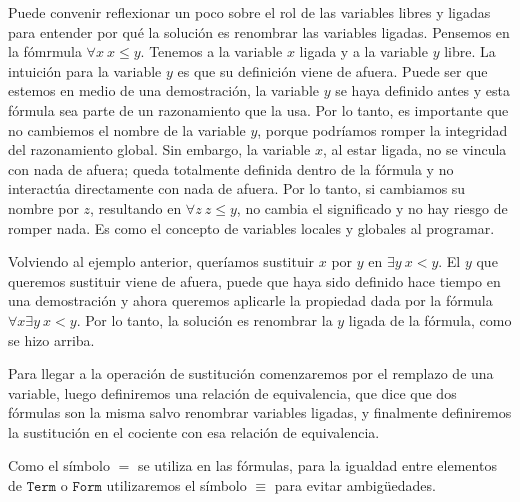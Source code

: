 \documentclass[a4paper, 12pt]{report}
\theoremstyle{definition}
\begin{document}
Puede convenir reflexionar un poco sobre el rol de las variables libres y ligadas para entender por qué la solución es renombrar las variables ligadas. Pensemos en la fómrmula $\forall x~ x\leq y$. Tenemos a la variable $x$ ligada y a la variable $y$ libre. La intuición para la variable $y$ es que su definición viene de afuera. Puede ser que estemos en medio de una demostración, la variable $y$ se haya definido antes y esta fórmula sea parte de un razonamiento que la usa. Por lo tanto, es importante que no cambiemos el nombre de la variable $y$, porque podríamos romper la integridad del razonamiento global. Sin embargo, la variable $x$, al estar ligada, no se vincula con nada de afuera; queda totalmente definida dentro de la fórmula y no interactúa directamente con nada de afuera. Por lo tanto, si cambiamos su nombre por $z$, resultando en $\forall z~ z\leq y$, no cambia el significado y no hay riesgo de romper nada. Es como el concepto de variables locales y globales al programar.

Volviendo al ejemplo anterior, queríamos sustituir $x$ por $y$ en $\exists y~ x<y$. El $y$ que queremos sustituir viene de afuera, puede que haya sido definido hace tiempo en una demostración y ahora queremos aplicarle la propiedad dada por la fórmula $\forall x\exists y~ x<y$. Por lo tanto, la solución es renombrar la $y$ ligada de la fórmula, como se hizo arriba.

Para llegar a la operación de sustitución comenzaremos por el remplazo de una variable, luego definiremos una relación de equivalencia, que dice que dos fórmulas son la misma salvo renombrar variables ligadas, y finalmente definiremos la sustitución en el cociente con esa relación de equivalencia.

Como el símbolo $=$ se utiliza en las fórmulas, para la igualdad entre elementos de $\mathtt{Term}$ o $\mathtt{Form}$ utilizaremos el símbolo $\equiv$ para evitar ambigüedades.
\end{document}
